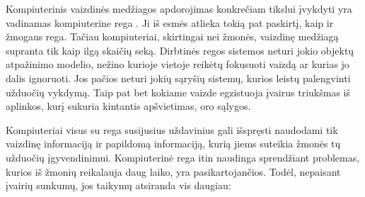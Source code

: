 \documentclass[a4paper,12pt]{article}
\begin{document}
Kompiuterinis vaizdinės medžiagos apdorojimas konkrečiam tikslui įvykdyti yra vadinamas kompiuterine rega \cite{OPENCV}. Ji iš esmės atlieka tokią pat paskirtį, kaip ir žmogaus rega. Tačiau kompiuteriai, skirtingai nei žmonės, vaizdinę medžiagą supranta tik kaip ilgą skaičių seką. Dirbtinės regos sistemos neturi jokio objektų atpažinimo modelio, nežino kurioje vietoje reikėtų fokusuoti vaizdą ar kurias jo dalis ignoruoti. Jos pačios neturi jokių sąryšių sistemų, kurios leistų palengvinti užduočių vykdymą. Taip pat bet kokiame vaizde egzistuoja įvairus triukšmas iš aplinkos, kurį sukuria kintantis apšvietimas, oro sąlygos.

Kompiuteriai visus su rega susijusius uždavinius gali išspręsti naudodami tik vaizdinę informaciją ir papildomą informaciją, kurią jiems suteikia žmonės tų užduočių įgyvendinimui. Kompiuterinė rega itin naudinga sprendžiant problemas, kurios iš žmonių reikalauja daug laiko, yra pasikartojančios. Todėl, nepaisant įvairių sunkumų, jos taikymų atsiranda vis daugiau:
\end{document}

